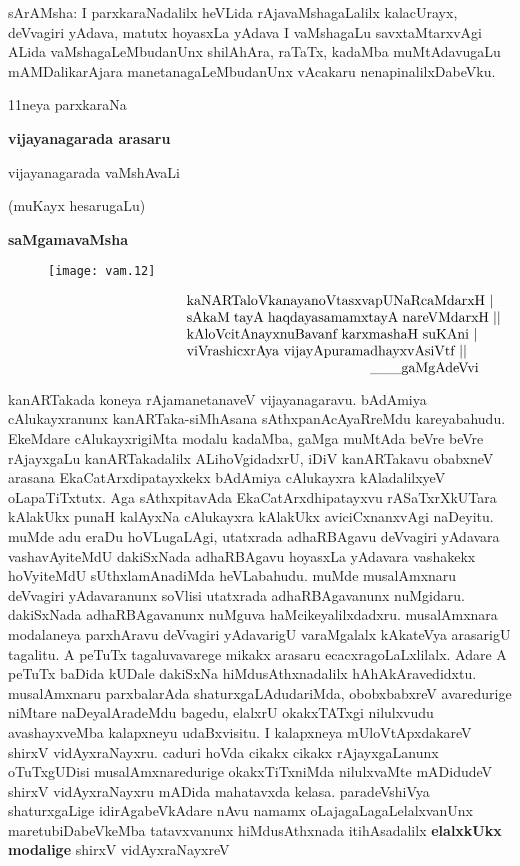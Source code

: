 \documentclass[11pt,a4size]{article}
\begin{document}
sArAMsha: I parxkaraNadalilx heVLida rAjavaMshagaLalilx kalacUrayx,
deVvagiri yAdava, matutx hoyasxLa yAdava I vaMshagaLu savxtaMtarxvAgi
ALida vaMshagaLeMbudanUnx shilAhAra, raTaTx, kadaMba muMtAdavugaLu
mAMDalikarAjara manetanagaLeMbudanUnx vAcakaru nenapinalilxDabeVku.

\newpage
\bigskip

\begin{center}
{\Huge 11neya parxkaraNa}

\smallskip
\textbf{\LARGE vijayanagarada arasaru}
\smallskip

vijayanagarada vaMshAvaLi

(muKayx hesarugaLu)
\medskip

\textbf{saMgamavaMsha}
\end{center} 



\begin{figure}[H]
\centering
\texttt{[image: vam.12]} 
\end{figure}



$$
\vbox{\parskip=0pt\parindent=0pt \everypar{\hskip12em} \obeylines
kaNARTaloVkanayanoVtasxvapUNaRcaMdarxH |
sAkaM tayA haqdayasamamxtayA nareVMdarxH ||
kAloVcitAnayxnuBavanf karxmashaH suKAni |
viVrashicxrAya vijayApuramadhayxvAsiVtf ||

\hspace{4.5cm} \_\_\_gaMgAdeVvi}\index{gaMgAdeVvi}
$$

kanARTakada koneya rAjamanetanaveV vijayanagaravu. bAdAmiya
cAlukayxranunx kanARTaka-siMhAsana sAthxpanAcAyaRreMdu
kareyabahudu. EkeMdare cAlukayxrigiMta modalu kadaMba, gaMga muMtAda
beVre beVre rAjayxgaLu kanARTakadalilx ALihoVgidadxrU, iDiV
kanARTakavu obabxneV arasana EkaCatArxdipatayxkekx bAdAmiya cAlukayxra
kAladalilxyeV oLapaTiTxtutx. Aga sAthxpitavAda EkaCatArxdhipatayxvu
rASaTxrXkUTara kAlakUkx punaH kalAyxNa cAlukayxra kAlakUkx
aviciCxnanxvAgi naDeyitu. muMde adu eraDu hoVLugaLAgi, utatxrada
adhaRBAgavu deVvagiri yAdavara vashavAyiteMdU dakiSxNada adhaRBAgavu
hoyasxLa yAdavara vashakekx hoVyiteMdU sUthxlamAnadiMda
heVLabahudu. muMde musalAmxnaru deVvagiri yAdavaranunx soVlisi
utatxrada adhaRBAgavanunx nuMgidaru. dakiSxNada adhaRBAgavanunx
nuMguva haMcikeyalilxdadxru. musalAmxnara modalaneya parxhAravu
deVvagiri yAdavarigU varaMgalalx kAkateVya arasarigU tagalitu. A
peTuTx tagaluvavarege mikakx arasaru ecacxragoLaLxlilalx. Adare A
peTuTx baDida kUDale dakiSxNa hiMdusAthxnadalilx
hAhAkAravedidxtu. musalAmxnaru parxbalarAda shaturxgaLAdudariMda,
obobxbabxreV avaredurige niMtare naDeyalAradeMdu bagedu, elalxrU
okakxTATxgi nilulxvudu avashayxveMba kalapxneyu udaBxvisitu. I
kalapxneya mUloVtApxdakareV shirxV vidAyxraNayxru.
 caduri hoVda cikakx
cikakx rAjayxgaLanunx oTuTxgUDisi musalAmxnaredurige okakxTiTxniMda
nilulxvaMte mADidudeV shirxV vidAyxraNayxru
 mADida mahatavxda
kelasa. paradeVshiVya shaturxgaLige idirAgabeVkAdare nAvu namamx
oLajagaLagaLelalxvanUnx maretubiDabeVkeMba tatavxvanunx hiMdusAthxnada
itihAsadalilx \textbf{elalxkUkx modalige} shirxV vidAyxraNayxreV
\end{document}
